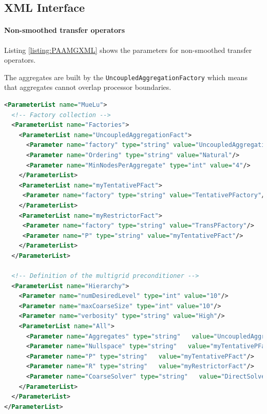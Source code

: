 \documentclass[12pt,a4paper]{article}
\newcommand{\MueLu}{MueLu}
\begin{document}
\subsection{XML Interface}

\paragraph{Non-smoothed transfer operators}

Listing \ref{listing:PAAMGXML} shows the parameters for non-smoothed transfer operators. 

The aggregates are built by the \verb|UncoupledAggregationFactory| which means that aggregates cannot overlap processor boundaries.

\begin{Listing} 
\begin{center} 
\begin{lstlisting}[language=XML,label=listing:PAXML]
<ParameterList name="MueLu">
  <!-- Factory collection -->
  <ParameterList name="Factories">
    <ParameterList name="UncoupledAggregationFact">
      <Parameter name="factory" type="string" value="UncoupledAggregationFactory"/>
      <Parameter name="Ordering" type="string" value="Natural"/>
      <Parameter name="MinNodesPerAggregate" type="int" value="4"/>
    </ParameterList>   
    <ParameterList name="myTentativePFact">
     <Parameter name="factory" type="string" value="TentativePFactory"/>
    </ParameterList>
    <ParameterList name="myRestrictorFact">
     <Parameter name="factory" type="string" value="TransPFactory"/>
     <Parameter name="P" type="string" value="myTentativePFact"/>
    </ParameterList>
  </ParameterList>

  <!-- Definition of the multigrid preconditioner -->
  <ParameterList name="Hierarchy">
    <Parameter name="numDesiredLevel" type="int" value="10"/>
    <Parameter name="maxCoarseSize" type="int" value="10"/>
    <Parameter name="verbosity" type="string" value="High"/>
    <ParameterList name="All">
      <Parameter name="Aggregates" type="string"   value="UncoupledAggregationFact"/>
      <Parameter name="Nullspace" type="string"   value="myTentativePFact"/>
      <Parameter name="P" type="string"   value="myTentativePFact"/>
      <Parameter name="R" type="string"   value="myRestrictorFact"/>
      <Parameter name="CoarseSolver" type="string"   value="DirectSolver"/>
    </ParameterList>
  </ParameterList>
</ParameterList>
\end{lstlisting}
\caption{Structure of XML input file for \MueLu~ with non-smoothed aggregation transfer operators.} 
\label{listing:PAAMGXML}
\end{center}
\end{Listing}
\end{document}
